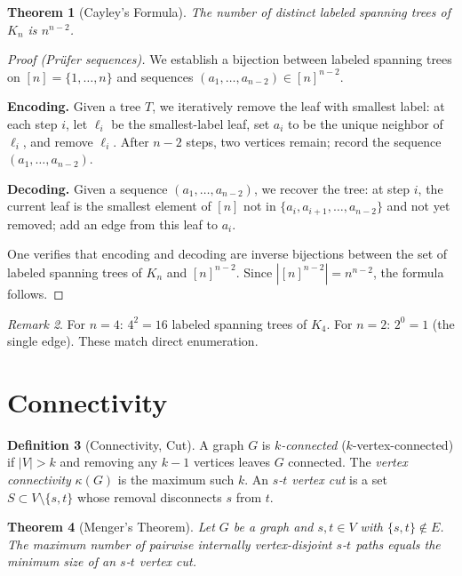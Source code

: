 \documentclass[12pt,a4paper]{amsart}
\newtheorem{theorem}{Theorem}[section]
\theoremstyle{definition}
\newtheorem{definition}[theorem]{Definition}
\theoremstyle{remark}
\newtheorem{remark}[theorem]{Remark}
\begin{document}
\begin{theorem}[Cayley's Formula]
\label{thm:cayley}
The number of distinct labeled spanning trees of $K_n$ is $n^{n-2}$.
\end{theorem}

\begin{proof}[Proof (Pr\"{u}fer sequences)]
We establish a bijection between labeled spanning trees on $[n] = \{1, \ldots, n\}$
and sequences $(a_1, \ldots, a_{n-2}) \in [n]^{n-2}$.

\textbf{Encoding.} Given a tree $T$, we iteratively remove the leaf with
smallest label: at each step $i$, let $\ell_i$ be the smallest-label leaf,
set $a_i$ to be the unique neighbor of $\ell_i$, and remove $\ell_i$. After
$n - 2$ steps, two vertices remain; record the sequence $(a_1, \ldots, a_{n-2})$.

\textbf{Decoding.} Given a sequence $(a_1, \ldots, a_{n-2})$, we recover the
tree: at step $i$, the current leaf is the smallest element of $[n]$ not in
$\{a_i, a_{i+1}, \ldots, a_{n-2}\}$ and not yet removed; add an edge from
this leaf to $a_i$.

One verifies that encoding and decoding are inverse bijections between the
set of labeled spanning trees of $K_n$ and $[n]^{n-2}$. Since $|[n]^{n-2}| = n^{n-2}$,
the formula follows.
\end{proof}

\begin{remark}
For $n = 4$: $4^2 = 16$ labeled spanning trees of $K_4$. For $n = 2$: $2^0 = 1$
(the single edge). These match direct enumeration.
\end{remark}

\section{Connectivity}
\label{sec:connectivity}

\begin{definition}[Connectivity, Cut]
A graph $G$ is \emph{$k$-connected} ($k$-vertex-connected) if $|V| > k$ and
removing any $k-1$ vertices leaves $G$ connected. The \emph{vertex connectivity}
$\kappa(G)$ is the maximum such $k$. An \emph{$s$-$t$ vertex cut} is a set
$S \subset V \setminus \{s,t\}$ whose removal disconnects $s$ from $t$.
\end{definition}

\begin{theorem}[Menger's Theorem]
\label{thm:menger}
Let $G$ be a graph and $s, t \in V$ with $\{s,t\} \notin E$. The maximum
number of pairwise internally vertex-disjoint $s$-$t$ paths equals the minimum
size of an $s$-$t$ vertex cut.
\end{theorem}
\end{document}
